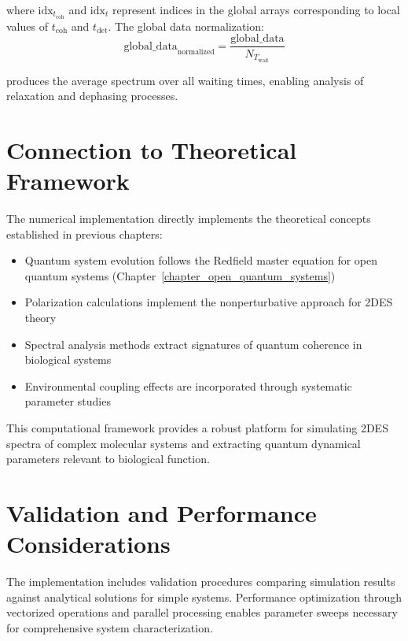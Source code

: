 \noindent
where $\text{idx}_{t_{\text{coh}}}$ and $\text{idx}_t$ represent indices in the global arrays corresponding to local values of $t_{\text{coh}}$ and $t_{\text{det}}$. The global data normalization:
\begin{equation}
	\label{eq:global_normalization}
	\text{global\_data}_{\text{normalized}} = \frac{\text{global\_data}}{N_{T_{\text{wait}}}}
\end{equation}

\noindent
produces the average spectrum over all waiting times, enabling analysis of relaxation and dephasing processes.

\section{Connection to Theoretical Framework}
\label{sec:connection_to_theory}

\noindent
The numerical implementation directly implements the theoretical concepts established in previous chapters:

\begin{itemize}
	\item Quantum system evolution follows the Redfield master equation for open quantum systems (Chapter~\ref{chapter_open_quantum_systems})
	\item Polarization calculations implement the nonperturbative approach for 2DES theory
	\item Spectral analysis methods extract signatures of quantum coherence in biological systems
	\item Environmental coupling effects are incorporated through systematic parameter studies
\end{itemize}

\noindent
This computational framework provides a robust platform for simulating 2DES spectra of complex molecular systems and extracting quantum dynamical parameters relevant to biological function.

\section{Validation and Performance Considerations}
\label{sec:validation_performance}

\noindent
The implementation includes validation procedures comparing simulation results against analytical solutions for simple systems. Performance optimization through vectorized operations and parallel processing enables parameter sweeps necessary for comprehensive system characterization.

